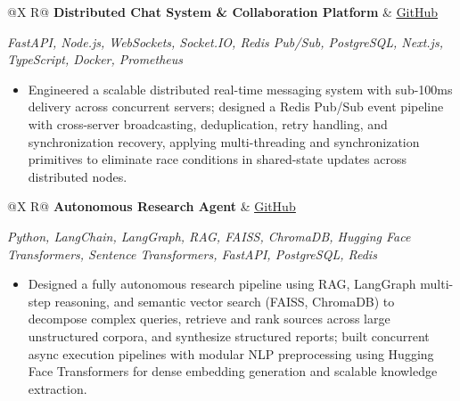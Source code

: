 \documentclass[a4paper,10pt]{article}
\newcommand{\ulink}[2]{\href{#1}{\uline{#2}}}
\newcommand{\subheading}[1]{{\color[HTML]{0A0A0A}\fontsize{12}{14}\selectfont\bfseries #1}}
\newcommand{\techstack}[1]{{\color[HTML]{5C5C5C}\fontsize{10.5}{12.5}\selectfont\itshape #1}}
\newcommand{\meta}[1]{{\color[HTML]{5C5C5C}\fontsize{10.5}{12.5}\selectfont #1}}
\begin{document}
\vspace{4pt}

\begin{tabularx}{\linewidth}{@{}X R@{}}
  \subheading{Distributed Chat System \& Collaboration Platform} &
  \meta{\ulink{https://github.com/su-jin1425/Distributed-Chat-System}{GitHub}}
\end{tabularx}
\vspace{1pt}
\techstack{FastAPI, Node.js, WebSockets, Socket.IO, Redis Pub/Sub, PostgreSQL, Next.js, TypeScript, Docker, Prometheus}
\begin{itemize}[nosep, leftmargin=1.5em, itemsep=1pt, topsep=2pt]
  \item {\color[HTML]{0A0A0A}\fontsize{11}{14}\selectfont Engineered a scalable distributed real-time messaging system with sub-100ms delivery across concurrent servers; designed a Redis Pub/Sub event pipeline with cross-server broadcasting, deduplication, retry handling, and synchronization recovery, applying multi-threading and synchronization primitives to eliminate race conditions in shared-state updates across distributed nodes.}
\end{itemize}

\vspace{4pt}
\newpage

\begin{tabularx}{\linewidth}{@{}X R@{}}
  \subheading{Autonomous Research Agent} &
  \meta{\ulink{https://github.com/su-jin1425/Autonomous-Research-Agent}{GitHub}}
\end{tabularx}
\vspace{1pt}
\techstack{Python, LangChain, LangGraph, RAG, FAISS, ChromaDB, Hugging Face Transformers, Sentence Transformers, FastAPI, PostgreSQL, Redis}
\begin{itemize}[nosep, leftmargin=1.5em, itemsep=1pt, topsep=2pt]
  \item {\color[HTML]{0A0A0A}\fontsize{11}{14}\selectfont Designed a fully autonomous research pipeline using RAG, LangGraph multi-step reasoning, and semantic vector search (FAISS, ChromaDB) to decompose complex queries, retrieve and rank sources across large unstructured corpora, and synthesize structured reports; built concurrent async execution pipelines with modular NLP preprocessing using Hugging Face Transformers for dense embedding generation and scalable knowledge extraction.}
\end{itemize}

\vspace{4pt}
\end{document}
